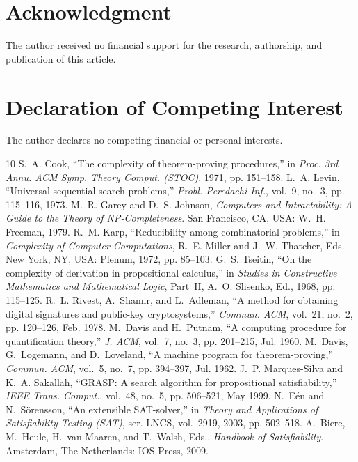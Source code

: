 \documentclass[letterpaper,journal]{IEEEtran}
\begin{document}
\section*{Acknowledgment}
The author received no financial support for the research, authorship, and
publication of this article.

\section*{Declaration of Competing Interest}
The author declares no competing financial or personal interests.

\begin{thebibliography}{10}
S.~A. Cook, ``The complexity of theorem-proving procedures,'' in
\emph{Proc. 3rd Annu. ACM Symp. Theory Comput. (STOC)}, 1971, pp. 151--158.
L.~A. Levin, ``Universal sequential search problems,'' \emph{Probl. Peredachi
Inf.}, vol.~9, no.~3, pp. 115--116, 1973.
M.~R. Garey and D.~S. Johnson, \emph{Computers and Intractability: A Guide
to the Theory of NP-Completeness}. San Francisco, CA, USA: W.~H. Freeman,
1979.
R.~M. Karp, ``Reducibility among combinatorial problems,'' in
\emph{Complexity of Computer Computations}, R.~E. Miller and J.~W. Thatcher,
Eds. New York, NY, USA: Plenum, 1972, pp. 85--103.
G.~S. Tseitin, ``On the complexity of derivation in propositional
calculus,'' in \emph{Studies in Constructive Mathematics and Mathematical
Logic}, Part~II, A.~O. Slisenko, Ed., 1968, pp. 115--125.
R.~L. Rivest, A.~Shamir, and L.~Adleman, ``A method for obtaining digital
signatures and public-key cryptosystems,'' \emph{Commun. ACM}, vol.~21,
no.~2, pp. 120--126, Feb. 1978.
M.~Davis and H.~Putnam, ``A computing procedure for quantification
theory,'' \emph{J. ACM}, vol.~7, no.~3, pp. 201--215, Jul. 1960.
M.~Davis, G.~Logemann, and D.~Loveland, ``A machine program for
theorem-proving,'' \emph{Commun. ACM}, vol.~5, no.~7, pp. 394--397,
Jul. 1962.
J.~P. Marques-Silva and K.~A. Sakallah, ``GRASP: A search algorithm for
propositional satisfiability,'' \emph{IEEE Trans. Comput.}, vol.~48,
no.~5, pp. 506--521, May 1999.
N.~E\'en and N.~S\"orensson, ``An extensible SAT-solver,'' in \emph{Theory
and Applications of Satisfiability Testing (SAT)}, ser. LNCS, vol.~2919,
2003, pp. 502--518.
A.~Biere, M.~Heule, H.~van Maaren, and T.~Walsh, Eds., \emph{Handbook of
Satisfiability}. Amsterdam, The Netherlands: IOS Press, 2009.

\end{thebibliography}
\end{document}
